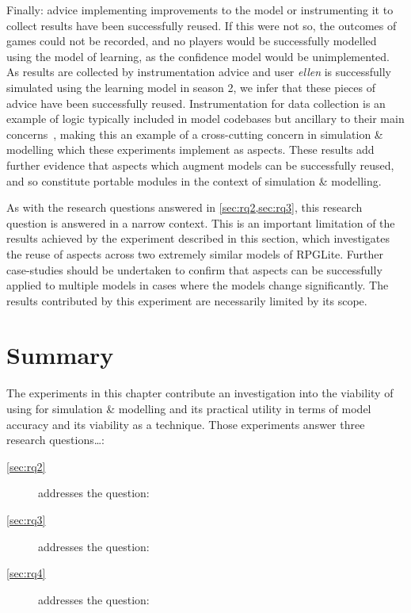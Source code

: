 Finally: advice implementing improvements to the model or instrumenting it to
collect results have been successfully reused. If this were not so, the outcomes
of games could not be recorded, and no players would be successfully modelled
using the model of learning, as the confidence model would be unimplemented. As
results are collected by instrumentation advice and user \emph{ellen} is
successfully simulated using the learning model in season 2, we infer that these
pieces of advice have been successfully reused. Instrumentation for data
collection is an example of logic typically included in model codebases but
ancillary to their main concerns~\cite{gulyas1999use}, making this an example of
a cross-cutting concern in simulation \& modelling which these experiments
implement as aspects. These results add further evidence that aspects which
augment models can be successfully reused, and so constitute portable modules in
the context of simulation \& modelling.

As with the research questions answered in \cref{sec:rq2,sec:rq3}, this research
question is answered in a narrow context. This is an important limitation of the
results achieved by the experiment described in this section, which investigates
the reuse of aspects across two extremely similar models of RPGLite. Further
case-studies should be undertaken to confirm that aspects can be successfully
applied to multiple models in cases where the models change significantly. The
results contributed by this experiment are necessarily limited by its scope.


\section{Summary}
\label{experiment_results_final_discussion}

The experiments in this chapter contribute an investigation into the
viability of using \aop for simulation \& modelling and its practical utility
in terms of model accuracy and its viability as a technique. Those experiments
answer three research questions…:

\begin{researchquestion}
\begin{description}
\item[\cref{sec:rq2}] addresses the question: \emph{\rqone{}}
\item[\cref{sec:rq3}] addresses the question: \emph{\rqtwo{}}
\item[\cref{sec:rq4}] addresses the question: \emph{\rqthree{}}
\end{description}
\end{researchquestion}

